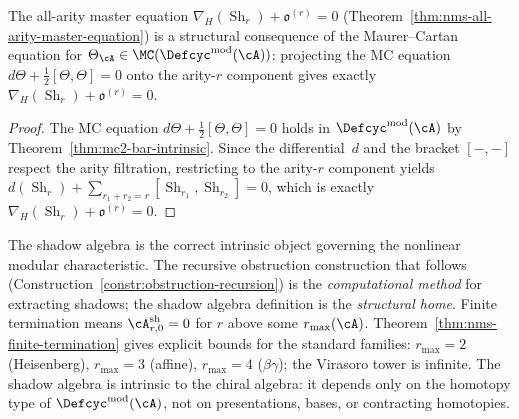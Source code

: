 \begin{proposition}
\label{prop:master-equation-from-mc}
\ClaimStatusProvedHere
{}
The all-arity master equation
$\nabla_H(\operatorname{Sh}_r) + \mathfrak{o}^{(r)} = 0$
(Theorem~\ref{thm:nms-all-arity-master-equation}) is a structural
consequence of the Maurer--Cartan equation for
$\Theta_{\cA} \in \MC(\Defcyc^{\mathrm{mod}}(\cA))$: projecting
the MC equation $d\Theta + \tfrac{1}{2}[\Theta,\Theta] = 0$ onto
the arity-$r$ component gives exactly
$\nabla_H(\operatorname{Sh}_r) + \mathfrak{o}^{(r)} = 0$.
\end{proposition}

\begin{proof}
The MC equation $d\Theta + \tfrac{1}{2}[\Theta,\Theta] = 0$ holds
in $\Defcyc^{\mathrm{mod}}(\cA)$ by
Theorem~\ref{thm:mc2-bar-intrinsic}.  Since the differential~$d$ and
the bracket $[-,-]$ respect the arity filtration, restricting to the
arity-$r$ component yields
$d(\operatorname{Sh}_r) + \sum_{r_1+r_2=r}
[\operatorname{Sh}_{r_1}, \operatorname{Sh}_{r_2}] = 0$,
which is exactly $\nabla_H(\operatorname{Sh}_r) + \mathfrak{o}^{(r)} = 0$.
\end{proof}

\begin{remark}
\label{rem:shadow-algebra-structural-home}
The shadow algebra is the correct intrinsic object governing
the nonlinear modular characteristic.  The recursive obstruction
construction that follows (Construction~\ref{constr:obstruction-recursion})
is the \emph{computational method} for extracting shadows; the
shadow algebra definition is the \emph{structural home}.  Finite termination means
$\cA^{\mathrm{sh}}_{r,0} = 0$ for $r$ above some
$r_{\max}(\cA)$.  Theorem~\ref{thm:nms-finite-termination} gives
explicit bounds for the standard families: $r_{\max} = 2$
(Heisenberg), $r_{\max} = 3$ (affine), $r_{\max} = 4$
($\beta\gamma$); the Virasoro tower is infinite.
The shadow algebra is intrinsic to the chiral algebra: it depends only on the homotopy type of $\Defcyc^{\mathrm{mod}}(\cA)$, not on presentations, bases, or contracting homotopies.
\end{remark}

